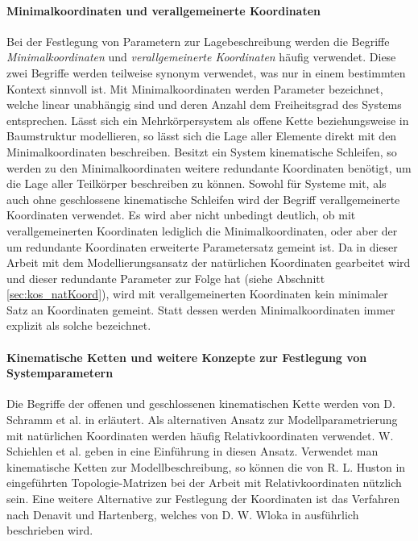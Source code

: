   \paragraph{Minimalkoordinaten und verallgemeinerte Koordinaten}
  Bei der Festlegung von Parametern zur Lagebeschreibung werden die Begriffe \textit{Minimalkoordinaten} und \textit{verallgemeinerte Koordinaten} h\"aufig verwendet. Diese zwei Begriffe werden teilweise synonym verwendet, was nur in einem bestimmten Kontext sinnvoll ist. \hfill \newline
  Mit Minimalkoordinaten werden Parameter bezeichnet, welche linear unabh\"angig sind und deren Anzahl dem Freiheitsgrad des Systems entsprechen. L\"asst sich ein Mehrk\"orpersystem als offene Kette beziehungsweise in Baumstruktur modellieren, so l\"asst sich die Lage aller Elemente direkt mit den Minimalkoordinaten beschreiben. \cite[S.27 f.]{Bestle2012} Besitzt ein System kinematische Schleifen, so werden zu den Minimalkoordinaten weitere redundante Koordinaten ben\"otigt, um die Lage aller Teilk\"orper beschreiben zu k\"onnen. \cite[S.63]{Schramm2010} Sowohl f\"ur Systeme mit, als auch ohne geschlossene kinematische Schleifen wird der Begriff verallgemeinerte Koordinaten verwendet.  Es wird aber nicht unbedingt deutlich, ob mit verallgemeinerten Koordinaten lediglich die Minimalkoordinaten, oder aber der um redundante Koordinaten erweiterte Parametersatz gemeint ist. \cite[S.133]{Woernle2011} Da in dieser Arbeit mit dem Modellierungsansatz der nat\"urlichen Koordinaten gearbeitet wird und dieser redundante Parameter zur Folge hat (siehe Abschnitt \ref{sec:kos_natKoord}), wird mit verallgemeinerten Koordinaten kein minimaler Satz an Koordinaten gemeint. Statt dessen werden Minimalkoordinaten immer explizit als solche bezeichnet. \hfill \newline
  \paragraph*{Kinematische Ketten und weitere Konzepte zur Festlegung von Systemparametern}
  Die Begriffe der offenen und geschlossenen kinematischen Kette werden von D. Schramm et al. in \cite[S. 52 ff.]{Schramm2010} erl\"autert. \hfill \newline
  Als alternativen Ansatz zur Modellparametrierung mit nat\"urlichen Koordinaten werden h\"aufig Relativkoordinaten verwendet. W. Schiehlen et al. geben in \cite{Schiehlen2014} eine Einf\"uhrung in diesen Ansatz. Verwendet man kinematische Ketten zur Modellbeschreibung, so k\"onnen die von R. L. Huston in \cite{Huston1986} eingef\"uhrten Topologie-Matrizen bei der Arbeit mit Relativkoordinaten n\"utzlich sein. Eine weitere Alternative zur Festlegung der Koordinaten ist das Verfahren nach Denavit und Hartenberg, welches von D. W. Wloka in \cite[S. 111 ff.]{Wloka1992} ausf\"uhrlich beschrieben wird.
